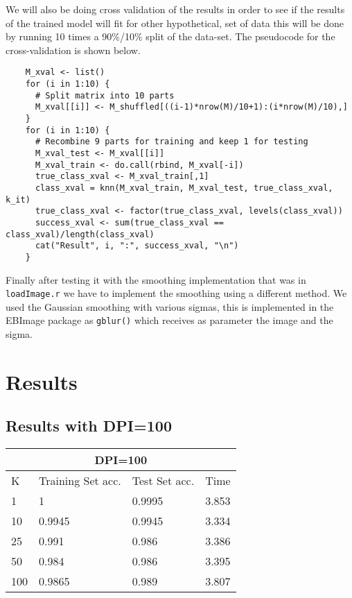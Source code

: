 \documentclass[paper=a4, fontsize=11pt]{scrartcl} %
\numberwithin{equation}{section} %
\numberwithin{figure}{section} %
\numberwithin{table}{section} %
\begin{document}
\begin{flushleft}
We will also be doing cross validation of the results in order to see if the results of the trained model will fit for other hypothetical, set of data this will be done by running 10 times a 90\%/10\% split of the data-set. The pseudocode for the cross-validation is shown below.
\end{flushleft}
\begin{lstlisting}
    M_xval <- list()
    for (i in 1:10) {
      # Split matrix into 10 parts
      M_xval[[i]] <- M_shuffled[((i-1)*nrow(M)/10+1):(i*nrow(M)/10),]
    }
    for (i in 1:10) {
      # Recombine 9 parts for training and keep 1 for testing
      M_xval_test <- M_xval[[i]]
      M_xval_train <- do.call(rbind, M_xval[-i])
      true_class_xval <- M_xval_train[,1]
      class_xval = knn(M_xval_train, M_xval_test, true_class_xval, k_it)
      true_class_xval <- factor(true_class_xval, levels(class_xval))
      success_xval <- sum(true_class_xval == class_xval)/length(class_xval)
      cat("Result", i, ":", success_xval, "\n")
    }
\end{lstlisting}

\begin{flushleft}
Finally after testing it with the smoothing implementation that was in \texttt{loadImage.r} we have to implement the smoothing using a different method. We used the Gaussian smoothing  with various sigmas, this is implemented in the EBImage package as \texttt{gblur()} which receives as parameter the image and the sigma.   
\end{flushleft}



\section*{Results}

\subsection*{Results with DPI=100}
\begin{tabular}{ |p{3cm}|p{3cm}|p{3cm}|p{3cm}|  }
 \hline
 \multicolumn{4}{|c|}{DPI=100} \\
 \hline
 K & Training Set acc. & Test Set acc. & Time\\
 \hline
 1 & 1 & 0.9995 & 3.853\\
 10 & 0.9945 & 0.9945 & 3.334\\
 25 & 0.991 & 0.986 & 3.386\\
 50 & 0.984 & 0.986 & 3.395\\
 100 & 0.9865 & 0.989 & 3.807\\
 \hline
\end{tabular}
\end{document}
